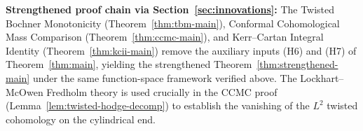 \textbf{Strengthened proof chain via Section~\ref{sec:innovations}:} The Twisted Bochner Monotonicity (Theorem~\ref{thm:tbm-main}), Conformal Cohomological Mass Comparison (Theorem~\ref{thm:ccmc-main}), and Kerr--Cartan Integral Identity (Theorem~\ref{thm:kcii-main}) remove the auxiliary inputs (H6) and (H7) of Theorem~\ref{thm:main}, yielding the strengthened Theorem~\ref{thm:strengthened-main} under the same function-space framework verified above. The Lockhart--McOwen Fredholm theory is used crucially in the CCMC proof (Lemma~\ref{lem:twisted-hodge-decomp}) to establish the vanishing of the $L^2$ twisted cohomology on the cylindrical end.
